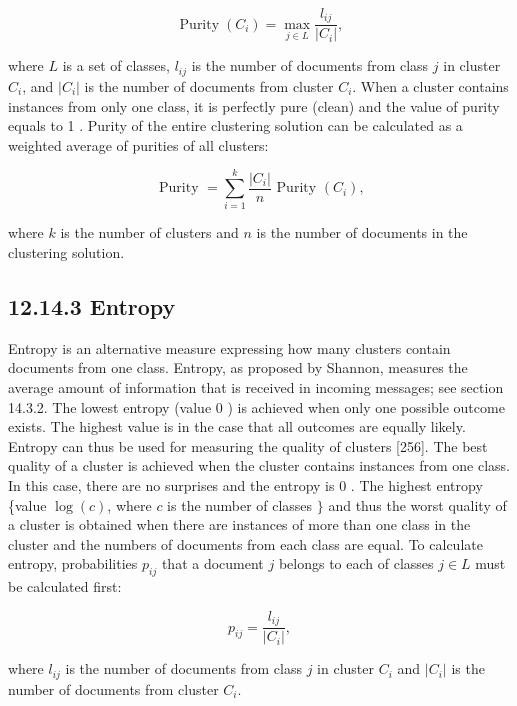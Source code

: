 \documentclass[10pt]{book}
\begin{document}
\begin{equation*}
\operatorname{Purity}\left(C_{i}\right)=\max _{j \in L} \frac{l_{i j}}{\left|C_{i}\right|}, \tag{12.40}
\end{equation*}


where $L$ is a set of classes, $l_{i j}$ is the number of documents from class $j$ in cluster $C_{i}$, and $\left|C_{i}\right|$ is the number of documents from cluster $C_{i}$. When a cluster contains instances from only one class, it is perfectly pure (clean) and the value of purity equals to 1 . Purity of the entire clustering solution can be calculated as a weighted average of purities of all clusters:


\begin{equation*}
\text { Purity }=\sum_{i=1}^{k} \frac{\left|C_{i}\right|}{n} \text { Purity }\left(C_{i}\right), \tag{12.41}
\end{equation*}


where $k$ is the number of clusters and $n$ is the number of documents in the clustering solution.

\subsection*{12.14.3 Entropy}
Entropy is an alternative measure expressing how many clusters contain documents from one class. Entropy, as proposed by Shannon, measures the average amount of information that is received in incoming messages; see section 14.3.2. The lowest entropy (value 0 ) is achieved when only one possible outcome exists. The highest value is in the case that all outcomes are equally likely. Entropy can thus be used for measuring the quality of clusters [256]. The best quality of a cluster is achieved when the cluster contains instances from one class. In this case, there are no surprises and the entropy is 0 . The highest entropy \{value $\log (c)$, where $c$ is the number of classes $\}$ and thus the worst quality of a cluster is obtained when there are instances of more than one class in the cluster and the numbers of documents from each class are equal. To calculate entropy, probabilities $p_{i j}$ that a document $j$ belongs to each of classes $j \in L$ must be calculated first:


\begin{equation*}
p_{i j}=\frac{l_{i j}}{\left|C_{i}\right|}, \tag{12.42}
\end{equation*}


where $l_{i j}$ is the number of documents from class $j$ in cluster $C_{i}$ and $\left|C_{i}\right|$ is the number of documents from cluster $C_{i}$.
\end{document}
